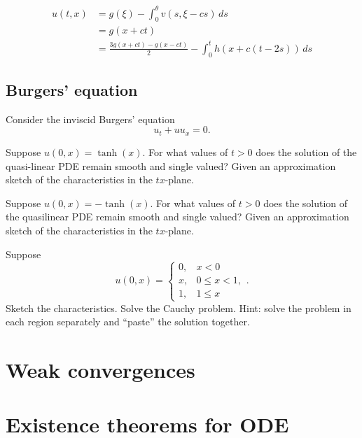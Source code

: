 \documentclass[11pt]{article}
\let\realsection\section
\renewcommand\section{\newpage\realsection}
\begin{document}
\begin{align*}
u(t,x)&=g(\xi)-\int_0^\theta v(s,\xi-cs)\,ds\\
&=g(x+ct)\\
&=\frac{3g(x+ct)-g(x-ct)}2-\int_0^th(x+c(t-2s))\,ds
\end{align*}



\clearpage
\subsection{Burgers' equation}

Consider the inviscid Burgers' equation
\[u_t+uu_x=0.\]
\begin{cond}
\item Suppose $u(0,x)=\tanh(x)$. For what values of $t>0$ does the solution of the quasi-linear PDE remain smooth and single valued? Given an approximation sketch of the characteristics in the $tx$-plane.
\item Suppose $u(0,x)=-\tanh(x)$. For what values of $t>0$ does the solution of the quasilinear PDE remain smooth and single valued? Given an approximation sketch of the characteristics in the $tx$-plane.
\item Suppose
\[u(0,x)=\begin{cases}0,&x<0\\x,&0\le x<1,\\1,&1\le x\end{cases}.\]
Sketch the characteristics. Solve the Cauchy problem. Hint: solve the problem in each region separately and ``paste'' the solution together.
\end{cond}


\section{Weak convergences}










\section{Existence theorems for ODE}
\end{document}

